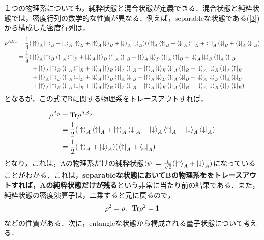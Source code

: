 １つの物理系についても，純粋状態と混合状態が定義できる．混合状態と純粋状態では，密度行列の数学的な性質が異なる．例えば，separableな状態である(\ref{3})から構成した密度行列は，
\begin{align}
  \rho^{AB_{p}}=\frac{1}{4}(&\ket{\uparrow}_{A}\ket{\uparrow}_{B}+\ket{\downarrow}_{A}\ket{\uparrow}_{B}+\ket{\uparrow}_{A}\ket{\downarrow}_{B}+\ket{\downarrow}_{A}\ket{\downarrow}_{B})
  (\bra{\uparrow}_{A}\bra{\uparrow}_{B}+\bra{\downarrow}_{A}\bra{\uparrow}_{B}+\bra{\uparrow}_{A}\bra{\downarrow}_{B}+\bra{\downarrow}_{A}\bra{\downarrow}_{B}) \nonumber \\
  =\frac{1}{4}(
&\ket{\uparrow}_{A}\ket{\uparrow}_{B}\bra{\uparrow}_{A}\bra{\uparrow}_{B}+\ket{\downarrow}_{A}\ket{\uparrow}_{B}\bra{\uparrow}_{A}\bra{\uparrow}_{B}+\ket{\uparrow}_{A}\ket{\downarrow}_{B}
\bra{\uparrow}_{A}\bra{\uparrow}_{B}+\ket{\downarrow}_{A}\ket{\downarrow}_{B}\bra{\uparrow}_{A}\bra{\uparrow}_{B}\nonumber \\
&+\ket{\uparrow}_{A}\ket{\uparrow}_{B}\bra{\downarrow}_{A}\bra{\uparrow}_{B}+\ket{\downarrow}_{A}\ket{\uparrow}_{B}\bra{\downarrow}_{A}\bra{\uparrow}_{B}+\ket{\uparrow}_{A}\ket{\downarrow}_{B}
\bra{\downarrow}_{A}\bra{\uparrow}_{B}+\ket{\downarrow}_{A}\ket{\downarrow}_{B}\bra{\downarrow}_{A}\bra{\uparrow}_{B}\nonumber \\
&+\ket{\uparrow}_{A}\ket{\uparrow}_{B}\bra{\uparrow}_{A}\bra{\downarrow}_{B}+\ket{\downarrow}_{A}\ket{\uparrow}_{B}\bra{\uparrow}_{A}\bra{\downarrow}_{B}+\ket{\uparrow}_{A}\ket{\downarrow}_{B}
\bra{\uparrow}_{A}\bra{\downarrow}_{B}+\ket{\downarrow}_{A}\ket{\downarrow}_{B}\bra{\uparrow}_{A}\bra{\downarrow}_{B}\nonumber \\
&+\ket{\uparrow}_{A}\ket{\uparrow}_{B}\bra{\downarrow}_{A}\bra{\downarrow}_{B}+\ket{\downarrow}_{A}\ket{\uparrow}_{B}\bra{\downarrow}_{A}\bra{\downarrow}_{B}+\ket{\uparrow}_{A}\ket{\downarrow}_{B}
\bra{\downarrow}_{A}\bra{\downarrow}_{B}+\ket{\downarrow}_{A}\ket{\downarrow}_{B}\bra{\downarrow}_{A}\bra{\downarrow}_{B}
)
\end{align}
となるが，この式でBに関する物理系をトレースアウトすれば，

\begin{align}
  \rho^{A_{p}}&=\rm{Tr}\rho^{AB_{p}} \\
  &=\frac{1}{2}(
\ket{\uparrow}_{A}\bra{\uparrow}_{A}+\ket{\uparrow}_{A}\bra{\downarrow}_{A}+\ket{\downarrow}_{A}\bra{\uparrow}_{A}+\ket{\downarrow}_{A}\bra{\downarrow}_{A})\\
&=\frac{1}{2}(\ket{\uparrow}_{A}+\ket{\downarrow}_{A})(\bra{\uparrow}_{A}+\bra{\downarrow}_{A})
\end{align}
となり，これは，Aの物理系だけの純粋状態$\bra{\psi}=\frac{1}{\sqrt{2}}(\ket{\uparrow}_{A}+\ket{\downarrow}_{A})$になっていることがわかる．これは，\textbf{separableな状態においてBの物理系ををトレースアウトすれば，Aの純粋状態だけが残る}という非常に当たり前の結果である．また，純粋状態の密度演算子は，二乗すると元に戻るので，
\begin{align}
  \rho^2=\rho,\hspace{2mm}\rm{Tr}\rho^2=1
\end{align}
などの性質がある．次に，entangleな状態から構成される量子状態について考える．


